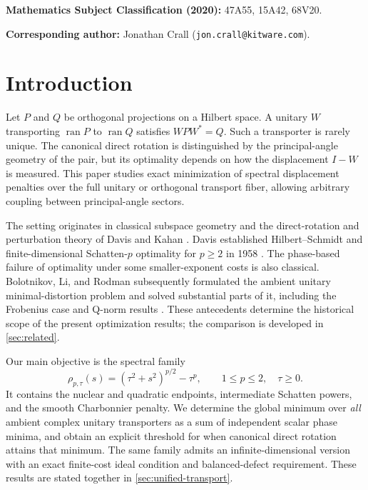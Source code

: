\documentclass[11pt]{article}
\begin{document}
\smallskip
\noindent\textbf{Mathematics Subject Classification (2020):}
47A55, 15A42, 68V20.

\smallskip
\noindent\textbf{Corresponding author:} Jonathan Crall
(\texttt{jon.crall@kitware.com}).

\section{Introduction}
\label{sec:introduction}

Let $P$ and $Q$ be orthogonal projections on a Hilbert space.  A
unitary $W$ transporting $\operatorname{ran}P$ to
$\operatorname{ran}Q$ satisfies $WPW^*=Q$.  Such a transporter is
rarely unique.  The canonical direct rotation is distinguished by the
principal-angle geometry of the pair, but its optimality depends on how
the displacement $I-W$ is measured.  This paper studies exact
minimization of spectral displacement penalties over the full unitary
or orthogonal transport fiber, allowing arbitrary coupling between
principal-angle sectors.

The setting originates in classical subspace geometry
\citep{dixmier1948position,davis1958separation,halmos1969two} and the
direct-rotation and perturbation theory of Davis and Kahan
\citep{davis1970rotation,kato1976perturbation}.  Davis established
Hilbert--Schmidt and finite-dimensional Schatten-$p$ optimality for
$p\ge2$ in 1958 \citep[Theorems~7.3--7.4]{davis1958separation}.
The phase-based failure of optimality under some smaller-exponent
costs is also classical.  Bolotnikov, Li, and Rodman subsequently
formulated the ambient unitary minimal-distortion problem and solved
substantial parts of it, including the Frobenius case and Q-norm
results \citep{bolotnikov2001minimal}.  These antecedents determine the
historical scope of the present optimization results; the comparison
is developed in \cref{sec:related}.

Our main objective is the spectral family
\[
 \rho_{p,\tau}(s)=(\tau^2+s^2)^{p/2}-\tau^p,
 \qquad 1\le p\le2,\quad\tau\ge0.
\]
It contains the nuclear and quadratic endpoints, intermediate Schatten
powers, and the smooth Charbonnier penalty.  We determine the global
minimum over \emph{all} ambient complex unitary transporters as a sum
of independent scalar phase minima, and obtain an explicit threshold
for when canonical direct rotation attains that minimum.  The same
family admits an infinite-dimensional version with an exact finite-cost
ideal condition and balanced-defect requirement.  These results are
stated together in \cref{sec:unified-transport}.
\end{document}
